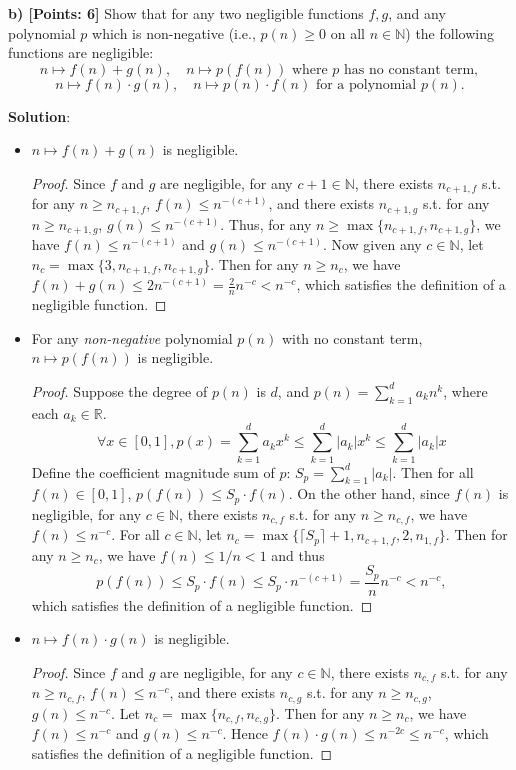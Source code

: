 \documentclass[12pt]{article}
\newcommand{\N}{\mathbb{N}}
\newcommand{\R}{\mathbb{R}}
\theoremstyle{definition}
\begin{document}
{\bf b) [Points: 6]} Show that for any two negligible functions $f, g$, and any polynomial $p$ which is non-negative (i.e., $p(n)\geq 0$ on all $n\in\N$) the following functions are negligible:
$$n \mapsto f(n)+g(n), \quad n \mapsto p(f(n)) \textrm{ where $p$ has no constant term},$$
$$n \mapsto f(n)\cdot g(n), \quad n \mapsto p(n)\cdot f(n) \textrm{ for a polynomial $p(n)$}.$$

{\bf Solution}:
\begin{itemize}
\item $n \mapsto f(n)+g(n)$ is negligible.
\begin{proof}
Since $f$ and $g$ are negligible, for any $c+1\in \N$, there exists $n_{c+1,f}$ s.t. for any $n\geq n_{c+1,f}$, $f(n) \leq n^{-(c+1)}$, and there exists $n_{c+1,g}$ s.t. for any $n\geq n_{c+1,g}$, $g(n) \leq n^{-(c+1)}$. Thus, for any $n\geq \max\{n_{c+1,f}, n_{c+1,g}\}$, we have $f(n) \leq n^{-(c+1)}$ and $g(n) \leq n^{-(c+1)}$. Now given any $c\in\N$, let $n_c = \max\{3, n_{c+1,f}, n_{c+1,g}\}$. Then for any $n\geq n_c$, we have $f(n)+g(n) \leq 2n^{-(c+1)} = \frac{2}{n}n^{-c} < n^{-c}$, which satisfies the definition of a negligible function.
\end{proof}

\item For any \emph{non-negative} polynomial $p(n)$ with no constant term, $n \mapsto p(f(n))$ is negligible.
\begin{proof}
Suppose the degree of $p(n)$ is $d$, and $p(n) = \sum_{k=1}^d a_kn^k$, where each $a_k\in\R$. 
$$\forall x\in [0,1], p(x) = \sum_{k=1}^d a_kx^k \leq \sum_{k=1}^d |a_k|x^k \leq \sum_{k=1}^d |a_k|x$$
Define the coefficient magnitude sum of $p$: $S_p = \sum_{k=1}^d |a_k|$. Then for all $f(n)\in[0,1]$, $p(f(n)) \leq S_p \cdot f(n)$.
On the other hand, since $f(n)$ is negligible, for any $c\in\N$, there exists $n_{c,f}$ s.t. for any $n\geq n_{c,f}$, we have $f(n)\leq n^{-c}$. 
For all $c\in\N$, let $n_c = \max\{\lceil S_p \rceil+1, n_{c+1,f}, 2, n_{1,f}\}$. Then for any $n\geq n_c$, we have $f(n)\leq 1/n<1$ and thus
$$p(f(n)) \leq S_p \cdot f(n) \leq S_p \cdot n^{-(c+1)} = \frac{S_p}{n}n^{-c} < n^{-c},$$
which satisfies the definition of a negligible function.
\end{proof}

\item $n \mapsto f(n)\cdot g(n)$ is negligible.
\begin{proof}
Since $f$ and $g$ are negligible, for any $c\in \N$, there exists $n_{c,f}$ s.t. for any $n\geq n_{c,f}$, $f(n) \leq n^{-c}$, and there exists $n_{c,g}$ s.t. for any $n\geq n_{c,g}$, $g(n) \leq n^{-c}$. Let $n_c = \max\{n_{c,f}, n_{c,g}\}$. Then for any $n\geq n_c$, we have $f(n) \leq n^{-c}$ and $g(n) \leq n^{-c}$. Hence $f(n)\cdot g(n) \leq n^{-2c} \leq n^{-c}$, which satisfies the definition of a negligible function.
\end{proof}


\end{itemize}
\end{document}
